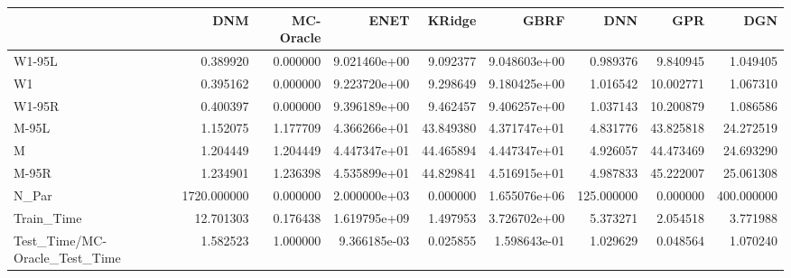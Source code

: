 \begin{tabular}{lrrrrrrrr}
\toprule
{} &          DNM &  MC-Oracle &          ENET &     KRidge &          GBRF &         DNN &        GPR &         DGN \\
\midrule
W1-95L                        &     0.389920 &   0.000000 &  9.021460e+00 &   9.092377 &  9.048603e+00 &    0.989376 &   9.840945 &    1.049405 \\
W1                            &     0.395162 &   0.000000 &  9.223720e+00 &   9.298649 &  9.180425e+00 &    1.016542 &  10.002771 &    1.067310 \\
W1-95R                        &     0.400397 &   0.000000 &  9.396189e+00 &   9.462457 &  9.406257e+00 &    1.037143 &  10.200879 &    1.086586 \\
M-95L                         &     1.152075 &   1.177709 &  4.366266e+01 &  43.849380 &  4.371747e+01 &    4.831776 &  43.825818 &   24.272519 \\
M                             &     1.204449 &   1.204449 &  4.447347e+01 &  44.465894 &  4.447347e+01 &    4.926057 &  44.473469 &   24.693290 \\
M-95R                         &     1.234901 &   1.236398 &  4.535899e+01 &  44.829841 &  4.516915e+01 &    4.987833 &  45.222007 &   25.061308 \\
N\_Par                         &  1720.000000 &   0.000000 &  2.000000e+03 &   0.000000 &  1.655076e+06 &  125.000000 &   0.000000 &  400.000000 \\
Train\_Time                    &    12.701303 &   0.176438 &  1.619795e+09 &   1.497953 &  3.726702e+00 &    5.373271 &   2.054518 &    3.771988 \\
Test\_Time/MC-Oracle\_Test\_Time &     1.582523 &   1.000000 &  9.366185e-03 &   0.025855 &  1.598643e-01 &    1.029629 &   0.048564 &    1.070240 \\
\bottomrule
\end{tabular}
